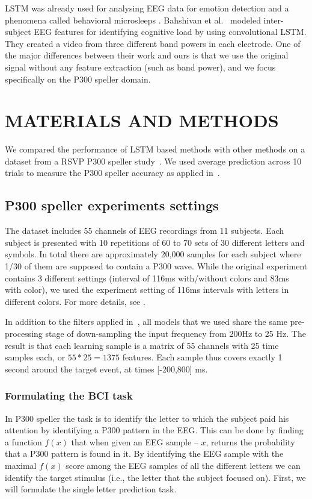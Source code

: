 \documentclass[
12pt, %
english, %
doublespacing, %
headsepline, %
]{MastersDoctoralThesis} %
\begin{document}
LSTM was already used for analysing EEG data for emotion detection \cite{soleymani2014continuous} and a phenomena called behavioral microsleeps \cite{davidson2005detecting}. Bahshivan et al.~\cite{LSTM_EEG} modeled inter-subject EEG features for identifying cognitive load by using convolutional LSTM. They created a video from three different band powers in each electrode. One of the major differences between their work and ours is that we use the original signal without any feature extraction (such as band power), and we focus specifically on the P300 speller domain.
\chapter{MATERIALS AND METHODS}

We compared the performance of LSTM based methods with other methods on a dataset from a RSVP P300 speller study~\cite{BlaknertzExperiment}. We used  average prediction across 10 trials to measure the P300 speller accuracy as applied in~\cite{BlaknertzExperiment}.

\section{P300 speller experiments settings}
The dataset includes 55 channels of EEG recordings from 11 subjects. Each subject is presented with 10 repetitions of 60 to 70 sets of 30 different letters and symbols. In total there are approximately 20,000 samples for each subject where 1/30 of them are supposed to contain a P300 wave. While the original experiment contains 3 different settings (interval of 116ms with/without colors and 83ms with color), we used the experiment setting of 116ms intervals with letters in different colors. For more details, see \cite{BlaknertzExperiment}. 

In addition to the filters applied in~\cite{BlaknertzExperiment}, all models that we used share the same pre-processing stage of down-sampling the input frequency from 200Hz to 25 Hz. The result is that each learning sample is a matrix of 55 channels with 25 time samples each, or $55*25 = 1375$ features. Each sample thus covers exactly 1 second around the target event, at times [-200,800] ms.

\subsection{Formulating the BCI task}
In P300 speller the task is to identify the letter to which the subject paid his attention by identifying a P300 pattern in the EEG. This can be done by finding a function $f(x)$ that when given an EEG sample – $x$, returns the probability that a P300 pattern is found in it. By identifying the EEG sample with the maximal $f(x)$ score among the EEG samples of all the different letters we can identify the target stimulus (i.e., the letter that the subject focused on). First, we will formulate the single letter prediction task.
\end{document}
